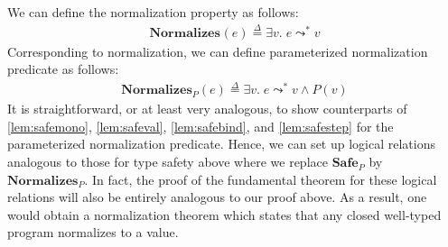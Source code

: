 \documentclass{article}
\newcommand{\defeq}{\overset{\Delta}{=}}
\newcommand{\pred}{P}
\newcommand{\expr}{e}
\newcommand{\val}{v}
\newcommand{\steps}{\leadsto^*}
\newcommand{\Safe}[1]{\textbf{Safe}_{#1}}
\begin{document}
\newcommand{\Normalizes}[1]{\mathbf{Normalizes}_{#1}}

We can define the normalization property as follows:
\begin{align*}
  \Normalizes{}(\expr) \defeq{} \exists \val.\; \expr \steps \val
\end{align*}
Corresponding to normalization, we can define parameterized normalization predicate as follows:
\begin{align*}
  \Normalizes{\pred}(\expr) \defeq{} \exists \val.\; \expr \steps \val \land \pred(\val)
\end{align*}
It is straightforward, or at least very analogous, to show counterparts of \ref{lem:safemono}, \ref{lem:safeval}, \ref{lem:safebind}, and \ref{lem:safestep} for the parameterized normalization predicate.
Hence, we can set up logical relations analogous to those for type safety above where we replace $\Safe{\pred}$ by $\Normalizes{\pred}$.
In fact, the proof of the fundamental theorem for these logical relations will also be entirely analogous to our proof above.
As a result, one would obtain a normalization theorem which states that any closed well-typed program normalizes to a value.
\end{document}
